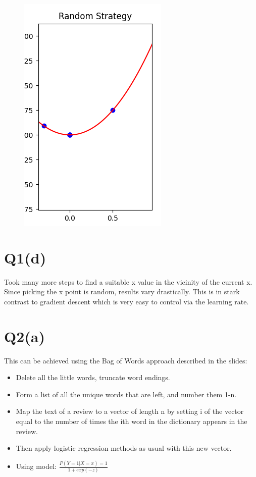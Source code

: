 \documentclass{article}
\begin{document}
        \begin{figure}[h]
            \includegraphics[scale=0.5]{c.png}
        \end{figure}    
    
        \section*{Q1(d)}
            Took many more steps to find a suitable x value in the vicinity
            of the current x. Since picking the x point is random, results vary drastically.
            This is in stark contrast to gradient descent which is very easy to control via the 
            learning rate.

        \section*{Q2(a)}
            This can be achieved using the Bag of Words approach described in the slides:

            \begin{itemize}
                \item Delete all the little words, truncate word endings.
                \item Form a list of all the unique words that are left, and number them 1-n.
                \item Map the text of a review to a vector of length n by setting i of the vector equal to the number of times the ith word
                      in the dictionary appears in the review.
                \item Then apply logistic regression methods as usual with this new vector.
                \item Using model: $\frac{P(Y=1 | X=x) = 1}{1 + exp(-z)}$
            \end{itemize}
        
\end{document}
